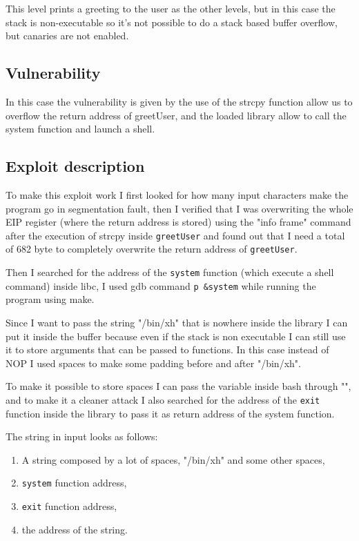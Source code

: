 \documentclass[a4paper,12pt]{article}
\begin{document}
This level prints a greeting to the user as the other levels, but in this case the stack is non-executable so it's not possible to do a stack based buffer overflow, but canaries are not enabled.

\subsection{Vulnerability}

In this case the vulnerability is given by the use of the strcpy function allow us to overflow the return address of greetUser, and the loaded library allow to call the system function and launch a shell.

\subsection{Exploit description} 

To make this exploit work I first looked for how many input characters make the program go in segmentation fault, then I verified that I was overwriting the whole EIP register (where the return address is stored) using the "info frame" command after the execution of strcpy inside \texttt{greetUser} and found out that I need a total of 682 byte to completely overwrite the return address of \texttt{greetUser}.

Then I searched for the address of the \texttt{system} function (which execute a shell command) inside libc, I used gdb command \texttt{p \&system} while running the program using make.

Since I want to pass the string "/bin/xh" that is nowhere inside the library I can put it inside the buffer because even if the stack is non executable I can still use it to store arguments that can be passed to functions. In this case instead of NOP I used spaces to make some padding before and after "/bin/xh".

To make it possible to store spaces I can pass the variable inside bash through "", and to make it a cleaner attack I also searched for the address of the \texttt{exit} function inside the library to pass it as return address of the system function.

The string in input looks as follows:
\begin{enumerate}
\item A string composed by a lot of spaces, "/bin/xh" and some other spaces,
\item \texttt{system} function address,
\item \texttt{exit} function address,
\item the address of the string.
\end{enumerate}
\end{document}
